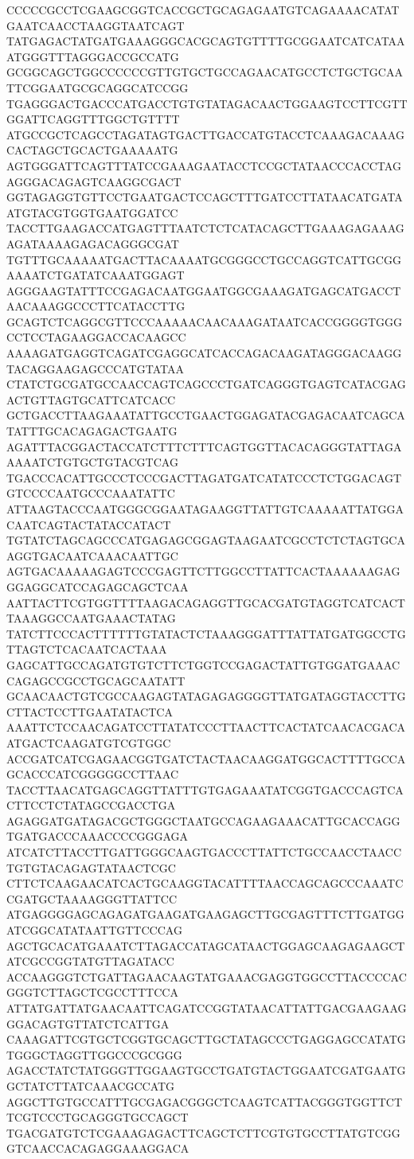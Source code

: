 CCCCCGCCTCGAAGCGGTCACCGCTGCAGAGAATGTCAGAAAACATATGAATCAACCTAAGGTAATCAGT
TATGAGACTATGATGAAAGGGCACGCAGTGTTTTGCGGAATCATCATAAATGGGTTTAGGGACCGCCATG
GCGGCAGCTGGCCCCCCGTTGTGCTGCCAGAACATGCCTCTGCTGCAATTCGGAATGCGCAGGCATCCGG
TGAGGGACTGACCCATGACCTGTGTATAGACAACTGGAAGTCCTTCGTTGGATTCAGGTTTGGCTGTTTT
ATGCCGCTCAGCCTAGATAGTGACTTGACCATGTACCTCAAAGACAAAGCACTAGCTGCACTGAAAAATG
AGTGGGATTCAGTTTATCCGAAAGAATACCTCCGCTATAACCCACCTAGAGGGACAGAGTCAAGGCGACT
GGTAGAGGTGTTCCTGAATGACTCCAGCTTTGATCCTTATAACATGATAATGTACGTGGTGAATGGATCC
TACCTTGAAGACCATGAGTTTAATCTCTCATACAGCTTGAAAGAGAAAGAGATAAAAGAGACAGGGCGAT
TGTTTGCAAAAATGACTTACAAAATGCGGGCCTGCCAGGTCATTGCGGAAAATCTGATATCAAATGGAGT
AGGGAAGTATTTCCGAGACAATGGAATGGCGAAAGATGAGCATGACCTAACAAAGGCCCTTCATACCTTG
GCAGTCTCAGGCGTTCCCAAAAACAACAAAGATAATCACCGGGGTGGGCCTCCTAGAAGGACCACAAGCC
AAAAGATGAGGTCAGATCGAGGCATCACCAGACAAGATAGGGACAAGGTACAGGAAGAGCCCATGTATAA
CTATCTGCGATGCCAACCAGTCAGCCCTGATCAGGGTGAGTCATACGAGACTGTTAGTGCATTCATCACC
GCTGACCTTAAGAAATATTGCCTGAACTGGAGATACGAGACAATCAGCATATTTGCACAGAGACTGAATG
AGATTTACGGACTACCATCTTTCTTTCAGTGGTTACACAGGGTATTAGAAAAATCTGTGCTGTACGTCAG
TGACCCACATTGCCCTCCCGACTTAGATGATCATATCCCTCTGGACAGTGTCCCCAATGCCCAAATATTC
ATTAAGTACCCAATGGGCGGAATAGAAGGTTATTGTCAAAAATTATGGACAATCAGTACTATACCATACT
TGTATCTAGCAGCCCATGAGAGCGGAGTAAGAATCGCCTCTCTAGTGCAAGGTGACAATCAAACAATTGC
AGTGACAAAAAGAGTCCCGAGTTCTTGGCCTTATTCACTAAAAAAGAGGGAGGCATCCAGAGCAGCTCAA
AATTACTTCGTGGTTTTAAGACAGAGGTTGCACGATGTAGGTCATCACTTAAAGGCCAATGAAACTATAG
TATCTTCCCACTTTTTTGTATACTCTAAAGGGATTTATTATGATGGCCTGTTAGTCTCACAATCACTAAA
GAGCATTGCCAGATGTGTCTTCTGGTCCGAGACTATTGTGGATGAAACCAGAGCCGCCTGCAGCAATATT
GCAACAACTGTCGCCAAGAGTATAGAGAGGGGTTATGATAGGTACCTTGCTTACTCCTTGAATATACTCA
AAATTCTCCAACAGATCCTTATATCCCTTAACTTCACTATCAACACGACAATGACTCAAGATGTCGTGGC
ACCGATCATCGAGAACGGTGATCTACTAACAAGGATGGCACTTTTGCCAGCACCCATCGGGGGCCTTAAC
TACCTTAACATGAGCAGGTTATTTGTGAGAAATATCGGTGACCCAGTCACTTCCTCTATAGCCGACCTGA
AGAGGATGATAGACGCTGGGCTAATGCCAGAAGAAACATTGCACCAGGTGATGACCCAAACCCCGGGAGA
ATCATCTTACCTTGATTGGGCAAGTGACCCTTATTCTGCCAACCTAACCTGTGTACAGAGTATAACTCGC
CTTCTCAAGAACATCACTGCAAGGTACATTTTAACCAGCAGCCCAAATCCGATGCTAAAAGGGTTATTCC
ATGAGGGGAGCAGAGATGAAGATGAAGAGCTTGCGAGTTTCTTGATGGATCGGCATATAATTGTTCCCAG
AGCTGCACATGAAATCTTAGACCATAGCATAACTGGAGCAAGAGAAGCTATCGCCGGTATGTTAGATACC
ACCAAGGGTCTGATTAGAACAAGTATGAAACGAGGTGGCCTTACCCCACGGGTCTTAGCTCGCCTTTCCA
ATTATGATTATGAACAATTCAGATCCGGTATAACATTATTGACGAAGAAGGGACAGTGTTATCTCATTGA
CAAAGATTCGTGCTCGGTGCAGCTTGCTATAGCCCTGAGGAGCCATATGTGGGCTAGGTTGGCCCGCGGG
AGACCTATCTATGGGTTGGAAGTGCCTGATGTACTGGAATCGATGAATGGCTATCTTATCAAACGCCATG
AGGCTTGTGCCATTTGCGAGACGGGCTCAAGTCATTACGGGTGGTTCTTCGTCCCTGCAGGGTGCCAGCT
TGACGATGTCTCGAAAGAGACTTCAGCTCTTCGTGTGCCTTATGTCGGGTCAACCACAGAGGAAAGGACA
